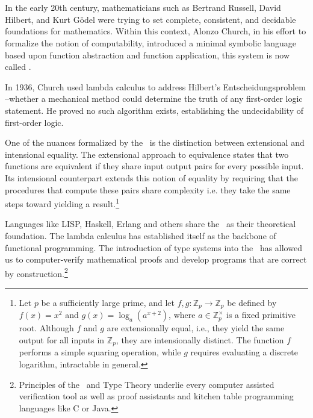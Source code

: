 \documentclass[12pt]{book}
\begin{document}
\chapter{\lCalc}

In the early 20th century, mathematicians such as Bertrand Russell, David Hilbert, and Kurt Gödel were trying to set complete, consistent, and decidable foundations for mathematics. Within this context, Alonzo Church, in his effort to formalize the notion of  computability, introduced a minimal symbolic language based upon function abstraction and function application, this system is now called \lcalc.

In 1936, Church used lambda calculus to address Hilbert’s Entscheidungsproblem --whether a mechanical method could determine the truth of any first-order logic statement. He proved no such algorithm exists, establishing the undecidability of first-order logic.

One of the nuances formalized by the \lcalc \ is the distinction between extensional and intensional equality. The extensional approach to equivalence states that two functions are equivalent if they share input output pairs for every possible input. Its intensional counterpart extends this notion of equality by requiring that the procedures that compute these pairs share complexity i.e. they take the same steps toward yielding a result.\footnote{
  Let \( p \) be a sufficiently large prime, and let \( f, g : \mathbb{Z}_p \to \mathbb{Z}_p \) be defined by \( f(x) = x^2 \) and \( g(x) = \log_a(a^{x+2}) \), where \( a \in \mathbb{Z}_p^\times \) is a fixed primitive root. Although \( f \) and \( g \) are extensionally equal, i.e., they yield the same output for all inputs in \( \mathbb{Z}_p \), they are intensionally distinct. The function \( f \) performs a simple squaring operation, while \( g \) requires evaluating a discrete logarithm, intractable in general. 
}

Languages like LISP, Haskell, Erlang and others share the \lcalc \ as their theoretical foundation. The lambda calculus has established itself as the backbone of functional programming. The introduction of type systems into the \lcalc \ has allowed us to computer-verify mathematical proofs and develop programs that are correct by construction.\footnote{Principles of the \lcalc \ and Type Theory underlie every computer assisted verification tool as well as proof assistants and kitchen table programming languages like C or Java.}

\newpage

\newpage

\newpage

\newpage

\end{document}
